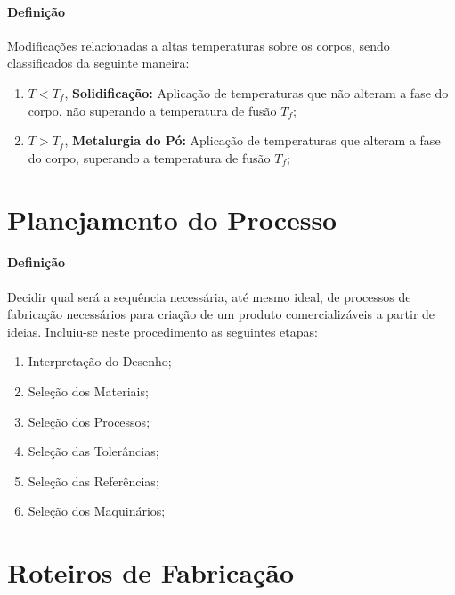 \documentclass{article}
\begin{document}
            \paragraph{Definição}Modificações relacionadas a altas temperaturas sobre os corpos, sendo classificados da seguinte maneira:
                \begin{enumerate}[rightmargin = \leftmargin]
                    \item $T < T_{f}$, \textbf{Solidificação:} Aplicação de temperaturas que não alteram a fase do corpo, não superando a temperatura de fusão $T_{f}$;

                    \item $T > T_{f}$, \textbf{Metalurgia do Pó:} Aplicação de temperaturas que alteram a fase do corpo, superando a temperatura de fusão $T_{f}$;
                \end{enumerate}
\newpage

    \section{Planejamento do Processo}
        \paragraph{Definição}Decidir qual será a sequência necessária, até mesmo ideal, de processos de fabricação necessários para criação de um produto comercializáveis a partir de ideias. Incluiu-se neste procedimento as seguintes etapas:
            \begin{enumerate}[rightmargin = \leftmargin, noitemsep]
                \item Interpretação do Desenho;
                \item Seleção dos Materiais;
                \item Seleção dos Processos;
                \item Seleção das Tolerâncias;
                \item Seleção das Referências;
                \item Seleção dos Maquinários;
            \end{enumerate}
\newpage

    \section{Roteiros de Fabricação}
\end{document}
